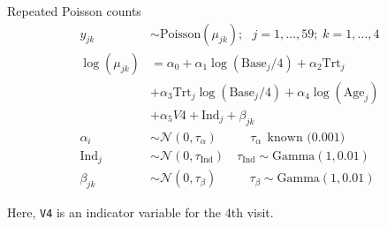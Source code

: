 \documentclass[
  handout]{beamer}
\begin{document}
\begin{frame}[fragile]{Repeated Poisson counts}
\protect\hypertarget{repeated-poisson-counts-1}{}
\[
\begin{aligned}
  y_{jk} & \sim  \text{Poisson}(\mu_{jk});\mbox{  }
        j=1,\dots,59;\; k=1,\dots,4\\
  \log(\mu_{jk})  &= \alpha_0 + \alpha_1
        \log(\text{Base}_j / 4) + \alpha_2\text{Trt}_j\\
    &+ \alpha_3\text{Trt}_j \log(\text{Base}_j / 4) +
        \alpha_4\log(\text{Age}_j) \\
        &+ \alpha_5 V4 + \text{Ind}_j + \beta_{jk}\\
        \alpha_i & \sim  \mathcal{N}(0, \tau_{\alpha})\mbox{   }
        \qquad\tau_{\alpha}\ \  \text{known (0.001)}\\
        \text{Ind}_j & \sim  \mathcal{N}(0, \tau_{\text{Ind}})\quad\tau_{\text{Ind}}\sim\text{Gamma}(1, 0.01)\\
        \beta_{jk} & \sim  \mathcal{N}(0, \tau_{\beta})\mbox{   }
        \qquad\tau_{\beta}\sim\text{Gamma}(1, 0.01)
\end{aligned}
\]

Here, \texttt{V4} is an indicator variable for the 4th visit.
\end{frame}
\end{document}
